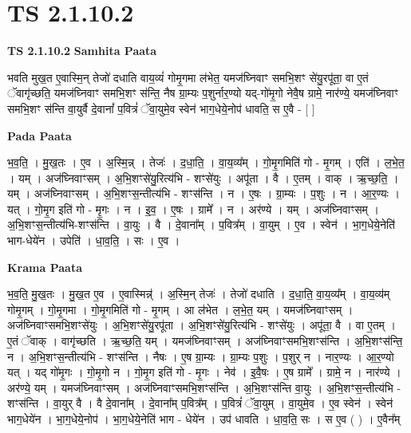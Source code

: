 \documentclass[17pt]{extarticle}
\begin{document}
\section*{ TS 2.1.10.2 }

\textbf{TS 2.1.10.2 } \newline
\textbf{Samhita Paata} \newline

भवति मुख॒त ए॒वास्मि॒न् तेजो॑ दधाति वाय॒व्यं॑ गोमृ॒गमा ल॑भेत॒ यमज॑घ्निवाꣳ समभि॒शꣳ से॑यु॒रपू॑ता॒ वा ए॒तं ॅवागृ॑च्छति॒ यमज॑घ्निवाꣳ समभि॒शꣳ स॑न्ति॒ नैष ग्रा॒म्यः प॒शुर्नार॒ण्यो यद्-गो॑मृ॒गो नेवै॒ष ग्रामे॒ नार॑ण्ये॒ यमज॑घ्निवाꣳ समभि॒शꣳ स॑न्ति वा॒युर्वै दे॒वानां᳚ प॒वित्रं॑ ॅवा॒युमे॒व स्वेन॑ भाग॒धेये॒नोप॑ धावति॒ स ए॒वै - [  ] \newline

\textbf{Pada Paata} \newline

भ॒व॒ति॒ । मु॒ख॒तः । ए॒व । अ॒स्मि॒न्न् । तेजः॑ । द॒धा॒ति॒ । वा॒य॒व्य᳚म् । गो॒मृ॒गमिति॑ गो - मृ॒गम् । एति॑ । ल॒भे॒त॒ । यम् । अज॑घ्निवाꣳसम् । अ॒भि॒शꣳसे॑यु॒रित्य॑भि - शꣳसे॑युः । अपू॑ता । वै । ए॒तम् । वाक् । ऋ॒च्छ॒ति॒ । यम् । अज॑घ्निवाꣳसम् । अ॒भि॒शꣳस॒न्तीत्य॑भि - शꣳस॑न्ति । न । ए॒षः । ग्रा॒म्यः । प॒शुः । न । आ॒र॒ण्यः । यत् । गो॒मृ॒ग इति॑ गो - मृ॒गः । न । इ॒व॒ । ए॒षः । ग्रामे᳚ । न । अर॑ण्ये । यम् । अज॑घ्निवाꣳसम् । अ॒भि॒शꣳस॒न्तीत्य॑भि-शꣳस॑न्ति । वा॒युः । वै । दे॒वाना᳚म् । प॒वित्र᳚म् । वा॒युम् । ए॒व । स्वेन॑ । भा॒ग॒धेये॒नेति॑ भाग-धेये॑न । उपेति॑ । धा॒व॒ति॒ । सः । ए॒व ।  \newline


\textbf{Krama Paata} \newline

भ॒व॒ति॒ मु॒ख॒तः । मु॒ख॒त ए॒व । ए॒वास्मिन्न्॑ । अ॒स्मि॒न् तेजः॑ । तेजो॑ दधाति । द॒धा॒ति॒ वा॒य॒व्य᳚म् । वा॒य॒व्य॑म् गोमृ॒गम् । गो॒मृ॒गमा । गो॒मृ॒गमिति॑ गो - मृ॒गम् । आ ल॑भेत । ल॒भे॒त॒ यम् । यमज॑घ्निवाꣳसम् । 
अज॑घ्निवाꣳसमभि॒शꣳसे॑युः । अ॒भि॒शꣳसे॑यु॒रपू॑ता । अ॒भि॒शꣳसे॑यु॒रित्य॑भि - शꣳसे॑युः । अपू॑ता॒ वै । वा ए॒तम् । ए॒तं ॅवाक् । वागृ॑च्छति । ऋ॒च्छ॒ति॒ यम् । यमज॑घ्निवाꣳसम् । अज॑घ्निवाꣳसमभि॒शꣳस॑न्ति । अ॒भि॒शꣳस॑न्ति॒ न । अ॒भि॒शꣳस॒न्तीत्य॑भि - शꣳस॑न्ति । नैषः । ए॒ष ग्रा॒म्यः । ग्रा॒म्यः प॒शुः । प॒शुर् न । नार॒ण्यः । आ॒र॒ण्यो यत् । यद् गो॑मृ॒गः । गो॒मृ॒गो न । गो॒मृ॒ग इति॑ गो - मृ॒गः । नेव॑ । इ॒वै॒षः । ए॒ष ग्रामे᳚ । ग्रामे॒ न । नार॑ण्ये । अर॑ण्ये॒ यम् । यमज॑घ्निवाꣳसम् । अज॑घ्निवाꣳसमभि॒शꣳस॑न्ति । अ॒भि॒शꣳस॑न्ति वा॒युः । अ॒भि॒शꣳस॒न्तीत्य॑भि - शꣳस॑न्ति । वा॒युर् वै । वै दे॒वाना᳚म् । दे॒वाना᳚म् प॒वित्र᳚म् । प॒वित्रं॑ ॅवा॒युम् । वा॒युमे॒व । ए॒व स्वेन॑ । स्वेन॑ भाग॒धेये॑न । भा॒ग॒धेये॒नोप॑ । भा॒ग॒धेये॒नेति॑ भाग - धेये॑न । उप॑ धावति । धा॒व॒ति॒ सः । स ए॒व ( ) । ए॒वैन᳚म् \newline
\end{document}
